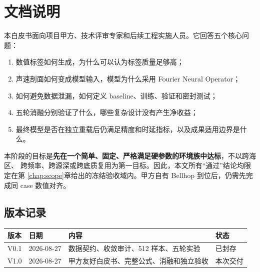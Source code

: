 \documentclass[UTF8,12pt,openany]{ctexrep}
\begin{document}

\chapter*{文档说明}

本白皮书面向项目甲方、技术评审专家和后续工程实施人员。它回答五个核心问题：

\begin{enumerate}
  \item 数值标签如何生成，为什么可以认为标签质量足够高；
  \item 声速剖面如何变成模型输入，模型为什么采用 Fourier Neural Operator；
  \item 如何避免数据泄漏，如何定义 baseline、训练、验证和密封测试；
  \item 五轮消融分别验证了什么，哪些复杂设计没有产生净收益；
  \item 最终模型是否在独立重载后仍满足精度和时延指标，以及成果适用边界是什么。
\end{enumerate}

\begin{riskbox}[重要口径]
本阶段的目标是\textbf{先在一个简单、固定、严格满足硬参数的环境族中达标}，不以跨海区、
跨频率、跨源深或跨底质复用为第一目标。因此，本文所有“通过”结论均限定在第
\ref{chap:scope}章给出的冻结验收域内。甲方自有 Bellhop 到位后，仍需先完成同 case 数值对齐。
\end{riskbox}

\section*{版本记录}
\noindent
\begin{tabularx}{\textwidth}{L{2.3cm}L{2.5cm}Y Y}
\toprule
版本 & 日期 & 内容 & 状态 \\
\midrule
V0.1 & 2026-08-27 & 数据契约、收敛审计、512 样本、五轮实验 & 已封存 \\
V1.0 & 2026-08-27 & 甲方友好白皮书、完整公式、消融和独立验收 & 本次交付 \\
\bottomrule
\end{tabularx}

\clearpage
\tableofcontents
\clearpage
{}

\end{document}
